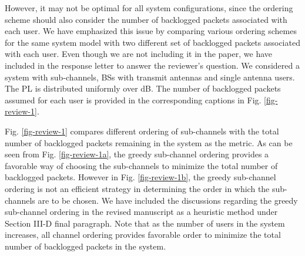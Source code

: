 \begin{enumerate}
However, it may not be optimal for all system configurations, since the ordering scheme should also consider the number of backlogged packets associated with each user. We have 
emphasized this issue by comparing various ordering schemes for the same system model with two different set of backlogged packets associated with each user. Even though we are not including it in the paper, we have included in the response letter to answer the reviewer's question. We considered a system with  sub-channels,  \acp{BS} with  transmit antennas and  single antenna users. The \ac{PL} is distributed uniformly over \eqn{[0,-3]} dB. The number of backlogged packets assumed for each user is provided in the corresponding captions in Fig. \ref{fig-review-1}.
\begin{figure*}[h!]
	\centering
	\hfill
	\caption{Convergence of the algorithms for  using  norm}
	\label{fig-review-1}
\end{figure*}

Fig. \ref{fig-review-1} compares different ordering of sub-channels with the total number of backlogged packets remaining in the system as the metric. As can be seen from Fig. \ref{fig-review-1a}, the greedy sub-channel ordering provides a favorable way of choosing the sub-channels to minimize the total number of backlogged packets. However in Fig. \ref{fig-review-1b}, the greedy sub-channel ordering is not an efficient strategy in determining the order in which the sub-channels are to be chosen. We have included the discussions regarding the greedy sub-channel ordering in the revised manuscript as a heuristic method under Section III-D final paragraph. Note that as the number of users in the system increases, all channel ordering provides favorable order to minimize the total number of backlogged packets in the system.


\end{enumerate}
